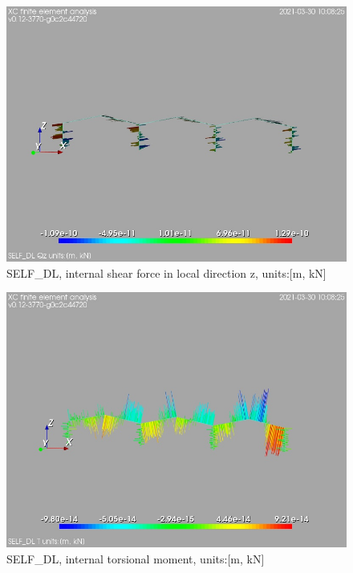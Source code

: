 \begin{figure}
\begin{center}
\includegraphics[width=\linewidth]{calc_results/sole_zeinali/text/graphics/resSimplLC/SELF_DLallMemberSetQz}
\caption{SELF_DL, internal shear force in local direction z, units:[m, kN]}
\end{center}
\end{figure}
\begin{figure}
\begin{center}
\includegraphics[width=\linewidth]{calc_results/sole_zeinali/text/graphics/resSimplLC/SELF_DLallMemberSetT}
\caption{SELF_DL, internal torsional moment, units:[m, kN]}
\end{center}
\end{figure}
